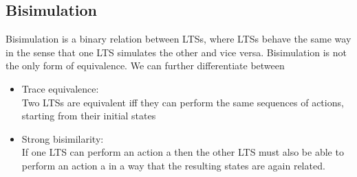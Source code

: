 \documentclass{clseminar}
\begin{document}
  \begin{center}
  \end{center}

  \subsection{Bisimulation}
  Bisimulation is a binary relation between LTSs, where LTSs behave the same way in the sense
  that one LTS simulates the other and vice versa. Bisimulation is not the only form of equivalence. We can further differentiate between

  \begin{itemize}[noitemsep]
    \item Trace equivalence: \\
    Two LTSs are equivalent iff they can perform the same sequences of actions, starting from their initial states \\
    \item Strong bisimilarity: \\
    If one LTS can perform an action a then the other LTS must also be able to perform an action a in a way that the resulting states are again related. \\
  \end{itemize}
\end{document}
